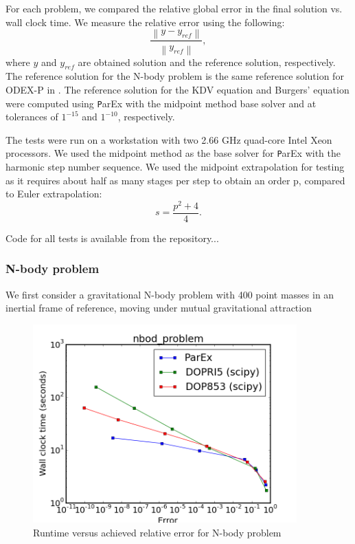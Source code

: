 \documentclass[12pt]{article}
\newcommand{\parex}{\texttt ParEx }
\newcommand\norm[1]{\left\lVert#1\right\rVert}
\begin{document}
For each problem, we compared the relative global error in the final solution
vs. wall clock time. We measure the relative error using the following:
$$\frac{\norm{y - y_{ref}}}{\norm{y_{ref}}},$$ where $y$ and $y_{ref}$ are
obtained solution and the reference solution, respectively. 
The reference solution for the N-body problem is the same reference solution for
ODEX-P in \cite{2014_hork}. The reference solution for the KDV
equation and Burgers' equation were computed using \parex with the midpoint
method base solver and at tolerances of $1^{-15}$ and  $1^{-10}$, respectively.

The tests were run on a workstation with two 2.66 GHz quad-core Intel Xeon processors. We used the midpoint method as the base solver for \parex with the harmonic step number sequence. We used the midpoint extrapolation for testing as it requires about half as many stages per step to obtain an order p, compared to Euler extrapolation: $$ s = \frac{p^2 + 4}{4}.$$ 

Code for all tests is available from the repository...

\subsubsection{N-body problem}
We first consider a gravitational N-body problem with 400
point masses in an inertial frame of reference, moving under mutual
gravitational attraction%
\begin{figure}[h]
 \includegraphics[width=4in]{images/nbod_problem_err_vs_time.png}
\centering
\caption{Runtime versus achieved relative error for N-body problem}
\end{figure} 
\end{document}

